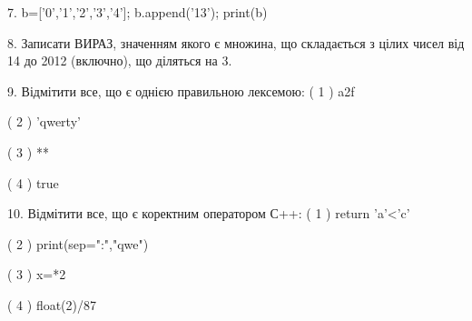 \documentclass[11pt]{article}
\begin{document}
\vspace{5mm}

7. 
b=['0','1','2','3','4']; b.append('13'); print(b)\vspace{5mm}

8. 
Записати ВИРАЗ, значенням якого є множина, що складається з цілих чисел від 14 до 2012 (включно), що діляться на 3.\vspace{5mm}

9. %
Відмітити все, що є однією правильною лексемою:
( 1 ) a2f

( 2 ) 'qwerty'

( 3 ) **

( 4 ) true
\vspace{5mm}

10. %
Відмітити все, що є коректним оператором С++:
( 1 ) return 'a'<'c'

( 2 ) print(sep=":","qwe")

( 3 ) x=*2

( 4 ) float(2)/87
\vspace{5mm}

\newpage
\end{document}
